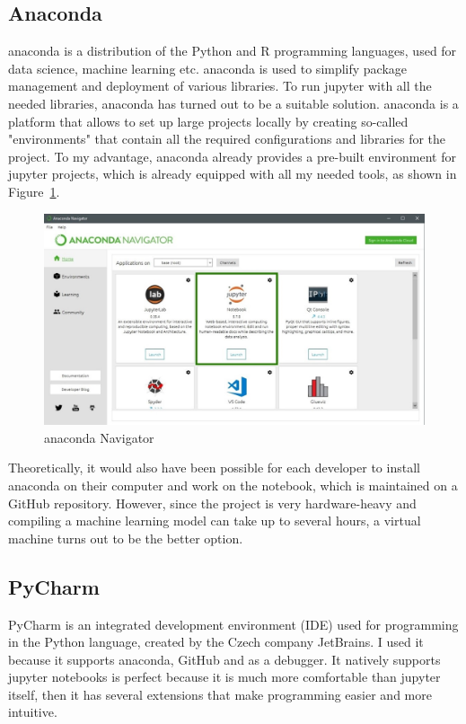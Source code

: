 \subsection{Anaconda}
\gls{anaconda} \cite{anaconda_inc_anaconda_nodate} is a distribution of the Python and R programming languages, used for data science, machine learning etc.
\gls{anaconda} is used to simplify package management and deployment of various libraries.
To run \gls{jupyter} with all the needed libraries, \gls{anaconda} has turned out to be a suitable solution. \gls{anaconda} is a platform that allows to set up large projects locally by creating so-called "environments" that contain all the required configurations and libraries for the project. To my advantage, \gls{anaconda} already provides a pre-built environment for \gls{jupyter} projects, which is already equipped with all my needed tools, as shown in Figure~\ref{fig:fig_01}.

\begin{figure}[ht!]
\centering
\includegraphics[width=1\textwidth]{images/anaconda.jpg}
\caption{\gls{anaconda} Navigator}
\label{fig:fig_01}
\end{figure}
\FloatBarrier

Theoretically, it would also have been possible for each developer to install \gls{anaconda} on their computer and work on the notebook, which is maintained on a \gls{GitHub} repository. However, since the project is very hardware-heavy and compiling a machine learning model can take up to several hours, a \gls{virtual machine} turns out to be the better option.

\subsection{PyCharm}
\gls{PyCharm} \cite{jetbrains_sro_pycharm_nodate} is an integrated development environment (IDE) used for programming in the Python language, created by the Czech company JetBrains. I used it because it supports anaconda, \gls{GitHub} and as a debugger.
It natively supports jupyter notebooks is perfect because it is much more comfortable than jupyter itself, then it has several extensions that make programming easier and more intuitive.

